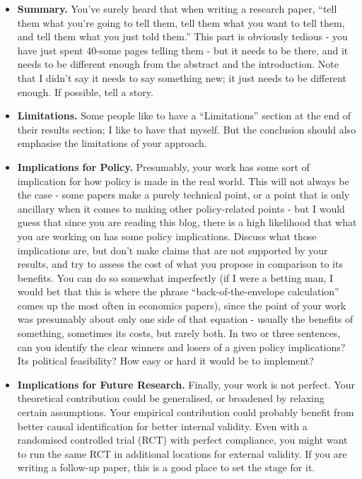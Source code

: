 \begin{itemize}
\item \textbf{Summary.} You’ve surely heard that when writing a research paper, ``tell them what you’re going to tell them, tell them what you want to tell them, and tell them what you just told them.'' This part is obviously tedious - you have just spent 40-some pages telling them - but it needs to be there, and it needs to be different enough from the abstract and the introduction. Note that I didn’t say it needs to say something new; it just needs to be different enough. If possible, tell a story.

\item \textbf{Limitations.} Some people like to have a ``Limitations'' section at the end of their results section; I like to have that myself. But the conclusion should also emphasise the limitations of your approach.

\item \textbf{Implications for Policy.} Presumably, your work has some sort of implication for how policy is made in the real world. This will not always be the case - some papers make a purely technical point, or a point that is only ancillary when it comes to making other policy-related points - but I would guess that since you are reading this blog, there is a high likelihood that what you are working on has some policy implications. Discuss what those implications are, but don’t make claims that are not supported by your results, and try to assess the cost of what you propose in comparison to its benefits. You can do so somewhat imperfectly (if I were a betting man, I would bet that this is where the phrase ``back-of-the-envelope calculation'' comes up the most often in economics papers), since the point of your work was presumably about only one side of that equation - usually the benefits of something, sometimes its costs, but rarely both. In two or three sentences, can you identify the clear winners and losers of a given policy implications? Its political feasibility? How easy or hard it would be to implement?

\item \textbf{Implications for Future Research.} Finally, your work is not perfect. Your theoretical contribution could be generalised, or broadened by relaxing certain assumptions. Your empirical contribution could probably benefit from better causal identification for better internal validity. Even with a randomised controlled trial (RCT) with perfect compliance, you might want to run the same RCT in additional locations for external validity. If you are writing a follow-up paper, this is a good place to set the stage for it.
\end{itemize}

